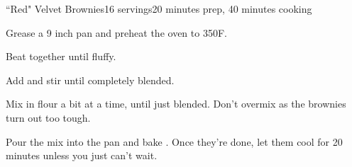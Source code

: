 \documentclass[../Cookbook.tex]{subfiles}
\begin{document}
\begin{recipe}{\textquotedblleft Red" Velvet Brownies}{16 servings}{20 minutes prep, 40 minutes cooking}

Grease a 9 inch pan and preheat the oven to 350\0F.

Beat together until fluffy.

Add and stir until completely blended.

Mix in flour a bit at a time, until just blended. Don't overmix as the brownies turn out too tough.

\newstep
Pour the mix into the pan and bake . Once they're done, let them cool for 20 minutes unless you just can't wait.

\end{recipe}
\end{document}
